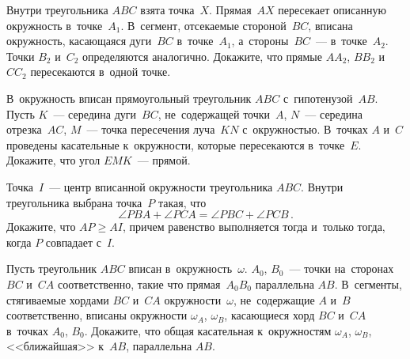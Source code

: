 \begin{problems}
\item
Внутри треугольника $ABC$ взята точка~$X$.
Прямая~$AX$ пересекает описанную окружность в~точке~$A_{1}$.
В~сегмент, отсекаемые стороной~$BC$, вписана окружность, касающаяся дуги~$BC$
в~точке~$A_{1}$, а~стороны~$BC$~--- в~точке~$A_{2}$.
Точки $B_{2}$ и~$C_{2}$ определяются аналогично.
Докажите, что прямые $AA_{2}$, $BB_{2}$ и~$CC_{2}$ пересекаются в~одной точке.

\item
В~окружность вписан прямоугольный треугольник $ABC$ с~гипотенузой~$AB$.
Пусть $K$~--- середина дуги~$BC$, не~содержащей точки~$A$, $N$~--- середина
отрезка~$AC$, $M$~--- точка пересечения луча~$KN$ с~окружностью.
В~точках $A$ и~$C$ проведены касательные к~окружности, которые пересекаются
в~точке~$E$.
Докажите, что угол $EMK$~--- прямой.

\item
Точка~$I$~--- центр вписанной окружности треугольника $ABC$.
Внутри треугольника выбрана точка~$P$ такая, что
\[
    \angle{PBA} + \angle{PCA} = \angle{PBC} + \angle{PCB}
\, . \]
Докажите, что $AP \geq AI$, причем равенство выполняется
тогда и~только тогда, когда $P$ совпадает с~$I$.

\item
Пусть треугольник $ABC$ вписан в~окружность~$\omega$.
$A_{0}$, $B_{0}$~--- точки на~сторонах $BC$ и~$CA$ соответственно, такие что
прямая~$A_{0}B_{0}$ параллельна $AB$.
В~сегменты, стягиваемые хордами $BC$ и~$CA$ окружности~$\omega$,
не~содержащие $A$ и~$B$ соответственно, вписаны
окружности $\omega_{A}$, $\omega_{B}$, касающиеся хорд $BC$ и~$CA$
в~точках $A_{0}$, $B_{0}$.
Докажите, что общая касательная к~окружностям $\omega_{A}$, $\omega_{B}$,
<<ближайшая>> к~$AB$, параллельна $AB$.

\fi

\end{problems}

